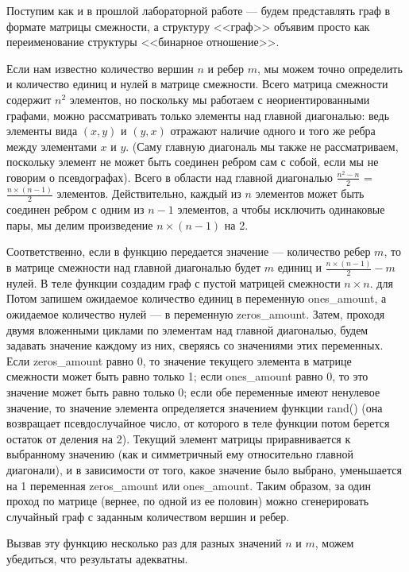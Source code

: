 \documentclass[12pt]{article}
\begin{document}
	Поступим как и в прошлой лабораторной работе --- будем представлять граф в формате матрицы смежности, а структуру <<граф>> объявим просто как переименование структуры <<бинарное отношение>>.
	
	Если нам известно количество вершин $n$ и ребер $m$, мы можем точно определить и количество единиц и нулей в матрице смежности. Всего матрица смежности содержит $n^2$ элементов, но поскольку мы работаем с неориентированными графами, можно рассматривать только элементы над главной диагональю: ведь элементы вида $(x, y)$ и $(y, x)$ отражают наличие одного и того же ребра между элементами $x$ и $y$. (Саму главную диагональ мы также не рассматриваем, поскольку элемент не может быть соединен ребром сам с собой, если мы не говорим о псевдографах). Всего в области над главной диагональю $\frac{n^2 - n}{2}$ = $\frac{n\times(n-1)}{2}$ элементов. Действительно, каждый из $n$ элементов может быть соединен ребром с одним из $n-1$ элементов, а чтобы исключить одинаковые пары, мы делим произведение $n\times(n-1)$ на 2. 
	
	Соответственно, если в функцию передается значение --- количество ребер $m$, то в матрице смежности над главной диагональю будет $m$ единиц и $\frac{n\times(n-1)}{2} - m$ нулей. В теле функции создадим граф с пустой матрицей смежности $n\times n$. для Потом запишем ожидаемое количество единиц в переменную ones\_amount, а ожидаемое количество нулей --- в переменную zeros\_amount. Затем, проходя двумя вложенными циклами по элементам над главной диагональю, будем задавать значение каждому из них, сверяясь со значениями этих переменных. Если zeros\_amount равно 0, то значение текущего элемента в матрице смежности может быть равно только 1; если ones\_amount равно 0, то это значение может быть равно только 0; если обе переменные имеют ненулевое значение, то значение элемента определяется значением функции rand() (она возвращает псевдослучайное число, от которого в теле функции потом берется остаток от деления на 2). Текущий элемент матрицы приравнивается к выбранному значению (как и симметричный ему относительно главной диагонали), и в зависимости от того, какое значение было выбрано, уменьшается на 1 переменная zeros\_amount или ones\_amount. Таким образом, за один проход по матрице (вернее, по одной из ее половин) можно сгенерировать случайный граф с заданным количеством вершин и ребер.
	
	Вызвав эту функцию несколько раз для разных значений $n$ и $m$, можем убедиться, что результаты адекватны. 
	
	 
	
\end{document}
